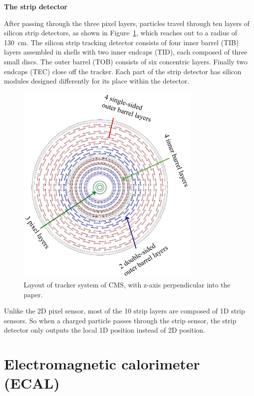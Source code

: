 {\bf The strip detector}

After passing through the three pixel layers, particles travel through ten layers of silicon strip detectors, 
as shown in Figure~\ref{fig:Strip}, which reaches out to a radius of 130~cm. The silicon strip tracking detector consists of four inner barrel (TIB) layers assembled in shells with two inner endcaps (TID), each composed of three small discs. The outer barrel (TOB) consists of six concentric layers. Finally two endcaps (TEC) close off the tracker. Each part of the strip detector has silicon modules designed differently for its place within the detector.

\begin{figure}[!htbp]
\centering
\includegraphics[width=0.8\textwidth]{figures/Strip.png}
\caption{Layout of tracker system of CMS, with z-axis perpendicular into the paper.}
\label{fig:Strip}
\end{figure}


Unlike the 2D pixel sensor, most of the 10 strip layers are composed of 1D strip sensors. So when a charged particle passes through the strip sensor, the strip detector only outputs the local 1D position instead of 2D position. 



\section{Electromagnetic calorimeter (ECAL) }



